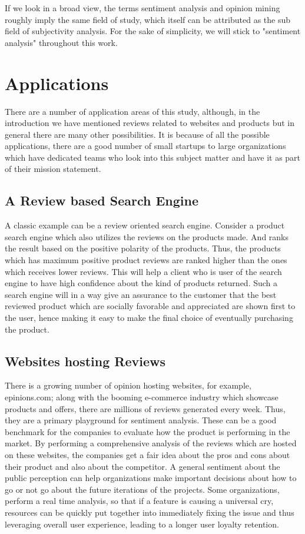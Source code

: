 If we look in a broad view, the terms sentiment analysis and opinion mining roughly imply the same field of study, which itself can be attributed as the sub field of subjectivity analysis. For the sake of simplicity, we will stick to "sentiment analysis" throughout this work. 

\section{Applications}
There are a number of application areas of this study, although, in the introduction we have mentioned reviews related to websites and products but in general there are many other possibilities. It is because of all the possible applications, there are a good number of small startups to large organizations which have dedicated teams who look into this subject matter and have it as part of their mission statement.


\subsection{A Review based Search Engine}
A classic example can be a review oriented search engine. Consider a product search engine which also utilizes the reviews on the products made. And ranks the result based on the positive polarity of the products. Thus, the products which has maximum positive  product reviews are ranked higher than the ones which receives lower reviews. This will help a client who is user of the search engine to have high confidence about the kind of products returned. Such a search engine will in a way give an assurance to the customer that the best reviewed product which are socially favorable and appreciated are shown first to the user, hence making it easy to make the final choice of eventually purchasing the product. 

\subsection{Websites hosting Reviews}
There is a growing number of opinion hosting websites, for example, epinions.com; along with the booming e-commerce industry which showcase products and offers, there are millions of reviews generated every week. Thus, they are a primary playground for sentiment analysis. These can be a good benchmark for the companies to evaluate how the product is performing in the market. By performing a comprehensive analysis of the reviews which are hosted on these websites, the companies get a fair idea about the pros and cons about their product and also about the competitor. A general sentiment about the public perception can help organizations make important decisions about how to go or not go about the future iterations of the projects. Some organizations, perform a real time analysis, so that if a feature is causing a universal cry, resources can be quickly put together into immediately fixing the issue and thus leveraging overall user experience, leading to a longer user loyalty retention.


